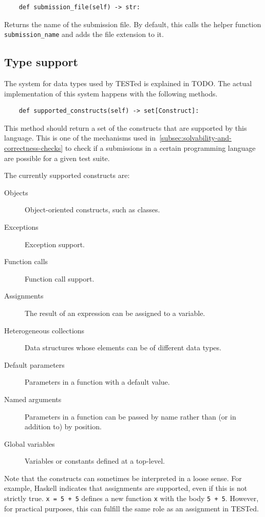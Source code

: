 \documentclass[../main]{subfiles}
\begin{document}
\begin{verbatim}
    def submission_file(self) -> str:
\end{verbatim}

Returns the name of the submission file.
By default, this calls the helper function \texttt{submission_name} and adds the file extension to it.

\subsection{Type support}\label{subsec:type-support}

The system for data types used by TESTed is explained in TODO.
The actual implementation of this system happens with the following methods.

\begin{verbatim}
    def supported_constructs(self) -> set[Construct]:
\end{verbatim}

This method should return a set of the constructs that are supported by this language.
This is one of the mechanisms used in~\cref{subsec:solvability-and-correctness-checks} to check if a submissions in a certain programming language are possible for a given test suite.

The currently supported constructs are:

\begin{description}
    \item[Objects] Object-oriented constructs, such as classes.
    \item[Exceptions] Exception support.
    \item[Function calls] Function call support.
    \item[Assignments] The result of an expression can be assigned to a variable.
    \item[Heterogeneous collections] Data structures whose elements can be of different data types.
    \item[Default parameters] Parameters in a function with a default value.
    \item[Named arguments] Parameters in a function can be passed by name rather than (or in addition to) by position.
    \item[Global variables] Variables or constants defined at a top-level.
\end{description}

Note that the constructs can sometimes be interpreted in a loose sense.
For example, Haskell indicates that assignments are supported, even if this is not strictly true.
\texttt{x = 5 + 5} defines a new function \texttt{x} with the body \texttt{5 + 5}.
However, for practical purposes, this can fulfill the same role as an assignment in TESTed.
\end{document}
